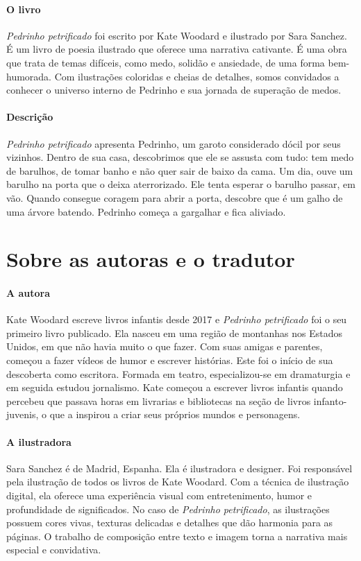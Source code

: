 \documentclass[11pt]{extarticle}
\begin{document}
\paragraph{O livro} \textit{Pedrinho petrificado} foi escrito por Kate Woodard e ilustrado por Sara Sanchez. É um livro de poesia ilustrado que oferece uma narrativa cativante. É uma obra que trata de temas difíceis, como medo, solidão e ansiedade, de uma forma bem-humorada. Com ilustrações coloridas e cheias de detalhes, somos convidados a conhecer o universo interno de Pedrinho e sua jornada de superação de medos.

\paragraph{Descrição} \textit{Pedrinho petrificado} apresenta Pedrinho, um garoto considerado dócil por seus vizinhos. Dentro de sua casa, descobrimos que ele se assusta com tudo: tem medo de barulhos, de tomar banho e não quer sair de baixo da cama. Um dia, ouve um barulho na porta que o deixa aterrorizado. Ele tenta esperar o barulho passar, em vão. Quando consegue coragem para abrir a porta, descobre que é um galho de uma árvore batendo. Pedrinho começa a gargalhar e fica aliviado.

\section{Sobre as autoras e o tradutor}


\paragraph{A autora} Kate Woodard escreve livros infantis desde 2017 e \textit{Pedrinho petrificado} foi o seu primeiro livro publicado. Ela nasceu em uma região de montanhas nos Estados Unidos, em que não havia muito o que fazer. Com suas amigas e parentes, começou a fazer vídeos de humor e escrever histórias. Este foi o início de sua descoberta como escritora. Formada em teatro, especializou-se em dramaturgia e em seguida estudou jornalismo. Kate começou a escrever livros infantis quando percebeu que passava horas em livrarias e bibliotecas na seção de livros infanto-juvenis, o que a inspirou a criar seus próprios mundos e personagens.

\paragraph{A ilustradora} Sara Sanchez é de Madrid, Espanha. Ela é ilustradora e designer. Foi responsável pela ilustração de todos os livros de Kate Woodard. Com a técnica de ilustração digital, ela oferece uma experiência visual com entretenimento, humor e profundidade de significados. No caso de \textit{Pedrinho petrificado}, as ilustrações possuem cores vivas, texturas delicadas e detalhes que dão harmonia para as páginas. O trabalho de composição entre texto e imagem torna a narrativa mais especial e convidativa.
\end{document}
